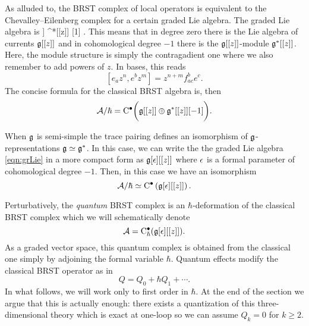 \documentclass[11pt]{amsart}
\begin{document}
As alluded to, the BRST complex of local operators is equivalent to the Chevalley--Eilenberg complex for a certain graded Lie algebra.
The graded Lie algebra is
\beqn\label{eqn:grLie}
\fg[[z]] \oplus \fg^*[[z]] [1] .
\eeqn
This means that in degree zero there is the Lie algebra of currents $\mathfrak g[[z]]$ and in cohomological degree $-1$ there is the $\mathfrak g[[z]]$-module $\mathfrak g^*[[z]]$. 
Here, the module structure is simply the contragadient one where we also remember to add powers of $z$.
In bases, this reads
\[
[e_a z^n , e^b z^m] = z^{n+m} f_{ac}^{b} e^c  .
\]
The concise formula for the classical BRST algebra is, then
\[
\mathcal A / \hbar = {\rm C}^\bullet \bigg(\mathfrak g[[z]] \oplus \mathfrak g^*[[z]] [-1] \bigg) .
\] 

When $\mathfrak g$ is semi-simple the trace pairing defines an isomorphism of $\mathfrak g$-representations $\mathfrak g \simeq \mathfrak g^*$. 
In this case, we can write the the graded Lie algebra \eqref{eqn:grLie} in a more compact form as $\mathfrak g[\epsilon] [[z]]$ where $\epsilon$ is a formal parameter of cohomological degree $-1$. 
Then, in this case we have an isomorphism
\[
\mathcal A / \hbar \simeq {\rm C}^\bullet \left(\mathfrak g[\epsilon][[z]]\right) .
\]


%
%

Perturbatively, the {\em quantum} BRST complex is an $\hbar$-deformation of the classical BRST complex which we will schematically denote
\[
\mathcal A = {\rm C}^\bullet_\hbar (\mathfrak g[\epsilon][[z]])  .
\]
As a graded vector space, this quantum complex is obtained from the classical one simply by adjoining the formal variable $\hbar$. 
Quantum effects modify the classical BRST operator as in
\[
Q = Q_0 + \hbar Q_1 + \cdots .
\]
In what follows, we will work only to first order in $\hbar$.
At the end of the section we argue that this is actually enough: there exists a quantization of this three-dimensional theory which is exact at one-loop so we can assume $Q_k = 0$ for $k \geq 2$. 
\end{document}
